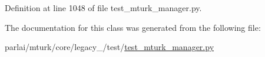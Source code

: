 Definition at line 1048 of file test\+\_\+mturk\+\_\+manager.\+py.



The documentation for this class was generated from the following file\+:\begin{DoxyCompactItemize}
\item 
parlai/mturk/core/legacy\+\_/test/\hyperlink{legacy__2018_2test_2test__mturk__manager_8py}{test\+\_\+mturk\+\_\+manager.\+py}\end{DoxyCompactItemize}
